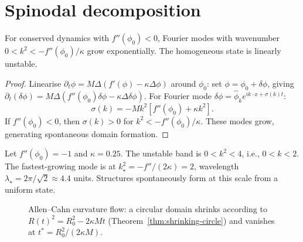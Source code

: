\section{Spinodal decomposition}

\begin{theorem}
  \label{thm:spinodal}
  \statusproven{}
  For conserved dynamics with $f''(\phi_0) < 0$, Fourier modes
  with wavenumber $0 < k^2 < -f''(\phi_0)/\kappa$ grow
  exponentially.
  The homogeneous state is linearly unstable.
\end{theorem}

\begin{proof}
  Linearise $\partial_t\phi = M\Delta(f'(\phi) - \kappa\Delta\phi)$
  around $\phi_0$: set $\phi = \phi_0 + \delta\phi$, giving
  $\partial_t(\delta\phi) = M\Delta(f''(\phi_0)\delta\phi
  - \kappa\Delta\delta\phi)$.
  For Fourier mode $\delta\phi = \hat\phi_k e^{ik\cdot x + \sigma(k)t}$:
  \[
    \sigma(k) = -Mk^2[f''(\phi_0) + \kappa k^2].
  \]
  If $f''(\phi_0) < 0$, then $\sigma(k) > 0$ for
  $k^2 < -f''(\phi_0)/\kappa$.
  These modes grow, generating spontaneous domain formation.
\end{proof}

\begin{WorkedExample}
  Let $f''(\phi_0) = -1$ and $\kappa = 0.25$.
  The unstable band is $0 < k^2 < 4$, i.e., $0 < k < 2$.
  The fastest-growing mode is at $k_\star^2 = -f''/(2\kappa) = 2$,
  wavelength $\lambda_\star = 2\pi/\sqrt{2} \approx 4.4$ units.
  Structures spontaneously form at this scale from a uniform state.
\end{WorkedExample}


\begin{figure}[ht]
\centering
{}
\caption{Allen--Cahn curvature flow: a circular domain shrinks
         according to $R(t)^2 = R_0^2 - 2\kappa M t$
         (Theorem~\ref{thm:shrinking-circle}) and vanishes at
         $t^* = R_0^2/(2\kappa M)$.}
\label{fig:ac-shrink}
\end{figure}

